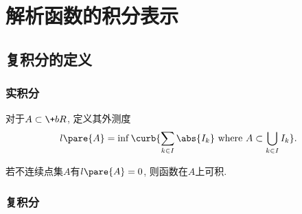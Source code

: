\documentclass{ctexart}
\begin{document}
\headerstamp

\section{解析函数的积分表示} %
\label{sec:解析函数的积分表示}

\subsection{复积分的定义} %
\label{sub:复积分的定义}

\subsubsection{实积分} %
\label{ssub:实积分}

\begin{definition}[外测度]
    对于$A\subset \+bR$, 定义其外测度
    \[ l\pare{A} = \inf\curb{\sum_{k\in I} \abs{I_k}\ \mathrm{where}\ A\subset \bigcup_{k\in I} I_k}. \]
\end{definition}
若不连续点集$A$有$l\pare{A} = 0$, 则函数在$A$上可积.


\subsubsection{复积分} %
\label{ssub:复积分}
\end{document}

